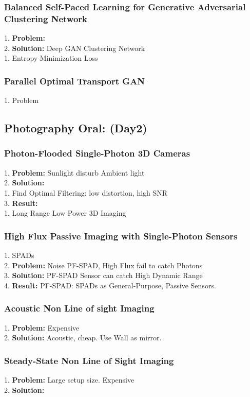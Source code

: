 \subsubsection{Balanced Self-Paced Learning for Generative Adversarial Clustering Network}
    1. {\bf Problem:}  \\
    2. {\bf Solution:} Deep GAN Clustering Network \\
        1. Entropy Minimization Loss \\
\subsubsection{Parallel Optimal Transport GAN}
    1. Problem


\subsection{Photography Oral: (Day2)}
\subsubsection{Photon-Flooded Single-Photon 3D Cameras}
    1. {\bf Problem:} Sunlight disturb Ambient light \\
    2. {\bf Solution:}  \\
        1. Find Optimal Filtering: low distortion, high SNR \\
    3. {\bf Result:} \\
        1. Long Range Low Power 3D Imaging \\
\subsubsection{High Flux Passive Imaging with Single-Photon Sensors}
    1. SPADs \\
    2. {\bf Problem:} Noise PF-SPAD, High Flux fail to catch Photons \\
    3. {\bf Solution:} PF-SPAD Sensor can catch High Dynamic Range \\
    4. {\bf Result:} PF-SPAD: SPADs as General-Purpose, Passive Sensors. \\
\subsubsection{Acoustic Non Line of sight Imaging}
    1. {\bf Problem:} Expensive \\
    2. {\bf Solution:} Acoustic, cheap. Use Wall as mirror. \\
\subsubsection{Steady-State Non Line of Sight Imaging}
    1. {\bf Problem:} Large setup size. Expensive \\
    2. {\bf Solution:} \\
